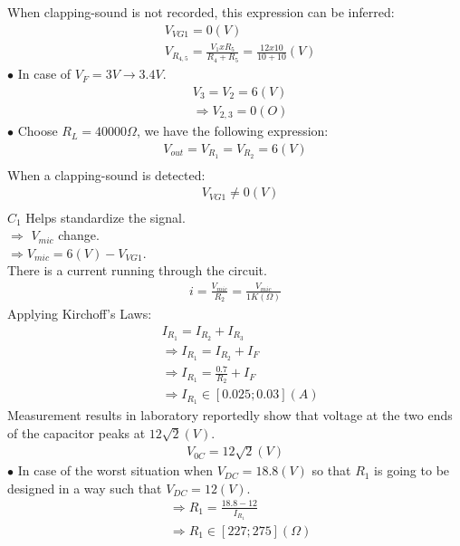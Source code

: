 \documentclass[12pt]{extarticle}
\newcommand{\<}{\langle}
\renewcommand{\>}{\rangle}
\theoremstyle{definition}
\begin{document}
\begin{normalsize}
When clapping-sound is not recorded, this expression can be inferred:
\begin{align*}
&V_{VG1} = 0(V)\\
&V_{R_{4,5}} = \frac{V_1 x R_5}{R_4 + R_5} = \frac{12x10}{10 + 10} (V)
\end{align*}
$\bullet$ In case of $V_F  = 3V \longrightarrow 3.4V$.
\begin{align*}
&V_3 = V_2 = 6 (V)\\ 
&\Rightarrow V_{2,3} = 0 (O)
\end{align*}
$\bullet$ Choose $R_L = 40000\Omega$, we have the following expression:
\begin{align*}
V_{out} = V_{R_1} = V_{R_2} = 6 (V)\\
\end{align*}
When a clapping-sound is detected:
\begin{align*}
&V_{VG1} \neq 0 (V)\\
\end{align*}
$C_1$ Helps standardize the signal.\\
$\Rightarrow$ $V_{mic}$ change.\\
$\Rightarrow V_{mic} = 6(V) - V_{VG1}$.\\
There is a current running through the circuit.\\
\begin{align*}
i = \frac{V_{mic}}{R_2} = \frac{V_{mic}}{1K(\Omega)}
\end{align*}
Applying Kirchoff's Laws:
\begin{align*}
&I_{R_1} = I_{R_2} + I_{R_3}\\
&\Longrightarrow I_{R_1} = I_{R_2} + I_F\\
&\Longrightarrow I_{R_1} = \frac{0.7}{R_2} + I_F\\
&\Longrightarrow I_{R_1} \in [0.025 ; 0.03] (A)
\end{align*}
Measurement results in laboratory reportedly show that voltage at the two ends of the capacitor peaks at $12\sqrt{2} (V)$.
\begin{align*}
V_{0C} = 12\sqrt{2} (V)
\end{align*}
$\bullet$ In case of the worst situation when $V_{DC} = 18.8(V)$ so that $R_1$ is going to be designed in a way such that $V_{DC} = 12 (V)$.
\begin{align*}
&\Longrightarrow R_1 = \frac{18.8 - 12}{I_{R_1}}\\
&\Longrightarrow R_1 \in [227 ; 275](\Omega)
\end{align*}

\end{normalsize}
\end{document}
